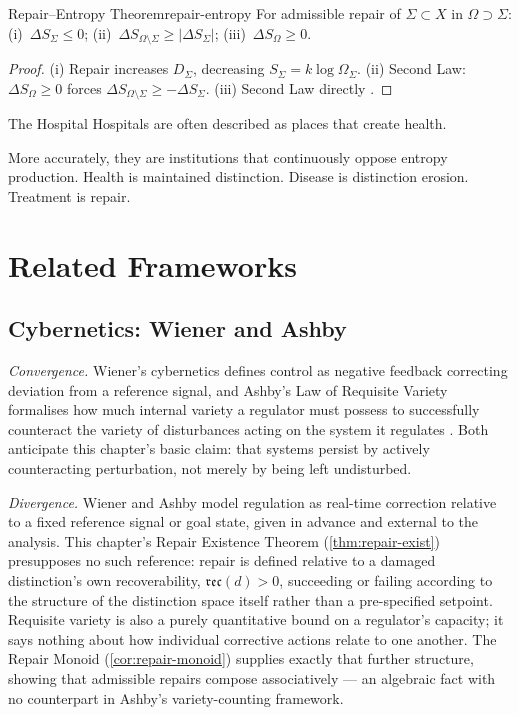 \documentclass[12pt,twoside,openright]{book}
\newcommand{\reco}{\mathfrak{rec}}
\begin{document}
\begin{theorem}{Repair--Entropy Theorem}{repair-entropy}
  For admissible repair of $\Sigma\subset X$ in
  $\Omega\supset\Sigma$:
  (i)~$\Delta S_\Sigma\le0$;
  (ii)~$\Delta S_{\Omega\setminus\Sigma}\ge|\Delta S_\Sigma|$;
  (iii)~$\Delta S_\Omega\ge0$.
\end{theorem}
\begin{proof}
  (i) Repair increases $D_\Sigma$, decreasing
  $S_\Sigma=k\log\Omega_\Sigma$.
  (ii) Second Law: $\Delta S_\Omega\ge0$ forces
  $\Delta S_{\Omega\setminus\Sigma}\ge-\Delta S_\Sigma$.
  (iii) Second Law directly \parencite{landauer1961irreversibility,
  bennett1982}.
\end{proof}

\begin{repairaside}{The Hospital}
Hospitals are often described as places that create health.

More accurately, they are institutions that continuously
oppose entropy production. Health is maintained distinction.
Disease is distinction erosion. Treatment is repair.
\end{repairaside}

\section{Related Frameworks}
\label{sec:ch7-related-frameworks}

\subsection*{Cybernetics: Wiener and Ashby}

\emph{Convergence.} Wiener's cybernetics defines control as
negative feedback correcting deviation from a reference signal,
and Ashby's Law of Requisite Variety formalises how much
internal variety a regulator must possess to successfully
counteract the variety of disturbances acting on the system it
regulates \parencite{wiener1948,ashby1956}. Both anticipate this
chapter's basic claim: that systems persist by actively
counteracting perturbation, not merely by being left undisturbed.

\emph{Divergence.} Wiener and Ashby model regulation as
real-time correction relative to a fixed reference signal or
goal state, given in advance and external to the analysis. This
chapter's Repair Existence Theorem (\cref{thm:repair-exist})
presupposes no such reference: repair is defined relative to a
damaged distinction's own recoverability, $\reco(d) > 0$,
succeeding or failing according to the structure of the
distinction space itself rather than a pre-specified setpoint.
Requisite variety is also a purely quantitative bound on a
regulator's capacity; it says nothing about how individual
corrective actions relate to one another. The Repair Monoid
(\cref{cor:repair-monoid}) supplies exactly that further
structure, showing that admissible repairs compose
associatively --- an algebraic fact with no counterpart in
Ashby's variety-counting framework.
\end{document}
